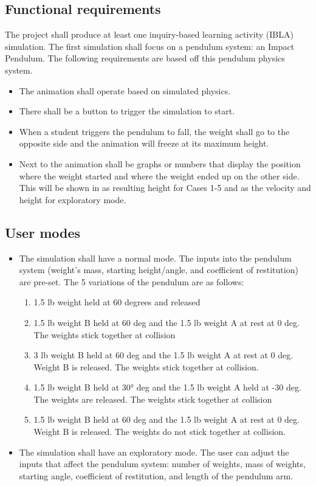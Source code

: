 \documentclass[onecolumn, draftclsnofoot,10pt, compsoc]{IEEEtran}
\begin{document}
\subsection{Functional requirements}
The project shall produce at least one inquiry-based learning activity (IBLA) simulation. The first simulation shall focus on a pendulum system: an Impact Pendulum. The following requirements are based off this pendulum physics system. 
\begin{itemize}
\item The animation shall operate based on simulated physics.
\item There shall be a button to trigger the simulation to start.
\item When a student triggers the pendulum to fall, the weight shall go to the opposite side and the animation will freeze at its maximum height.
\item Next to the animation shall be graphs or numbers that display the position where the weight started and where the weight ended up on the other side. This will be shown in as resulting height for Cases 1-5 and as the velocity and height for exploratory mode.
\end{itemize}
\subsection{User modes}
\begin{itemize}
\item The simulation shall have a normal mode. The inputs into the pendulum system (weight's mass, starting height/angle, and coefficient of restitution) are pre-set.
The 5 variations of the pendulum are as follows:
\begin{enumerate}
    \item 1.5 lb weight held at 60 degrees and released
    \item 1.5 lb weight B held at 60 deg and the 1.5 lb
weight A at rest at 0 deg. The weights stick together at collision
    \item 3 lb weight B held at 60 deg and the 1.5 lb weight A at rest at 0 deg. Weight B is released. The weights stick together at collision.
    \item 1.5 lb weight B held at 30° deg and the 1.5 lb weight A held at -30 deg. The weights are released. The weights stick together at collision
    \item 1.5 lb weight B held at 60 deg and the 1.5 lb weight A at rest at 0 deg. Weight B is released. The weights do not stick together at collision.
\end{enumerate}
\item The simulation shall have an exploratory mode. The user can adjust the inputs that affect the pendulum system:
number of weights, mass of weights, starting angle, coefficient of restitution, and length of the pendulum arm. 
\end{itemize}
\end{document}
